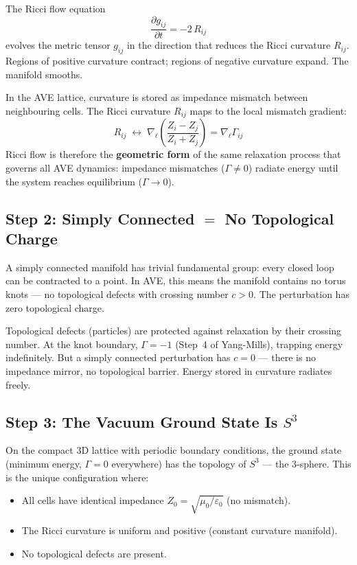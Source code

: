 The Ricci flow equation
\begin{equation}
    \frac{\partial g_{ij}}{\partial t} = -2\, R_{ij}
\end{equation}
evolves the metric tensor $g_{ij}$ in the direction that reduces the Ricci curvature $R_{ij}$. Regions of positive curvature contract; regions of negative curvature expand. The manifold smooths.

In the AVE lattice, curvature is stored as impedance mismatch between neighbouring cells. The Ricci curvature $R_{ij}$ maps to the local mismatch gradient:
\begin{equation}
    R_{ij} \;\longleftrightarrow\; \nabla_\ell \left(\frac{Z_i - Z_j}{Z_i + Z_j}\right) = \nabla_\ell \Gamma_{ij}
\end{equation}
Ricci flow is therefore the \textbf{geometric form} of the same relaxation process that governs all AVE dynamics: impedance mismatches ($\Gamma \neq 0$) radiate energy until the system reaches equilibrium ($\Gamma \to 0$).

\subsection{Step 2: Simply Connected $=$ No Topological Charge}

A simply connected manifold has trivial fundamental group: every closed loop can be contracted to a point. In AVE, this means the manifold contains no torus knots --- no topological defects with crossing number $c > 0$. The perturbation has zero topological charge.

Topological defects (particles) are protected against relaxation by their crossing number. At the knot boundary, $\Gamma = -1$\gammaundeclared{} (Step~4 of Yang-Mills), trapping energy indefinitely. But a simply connected perturbation has $c = 0$ --- there is no impedance mirror, no topological barrier. Energy stored in curvature radiates freely.

\subsection{Step 3: The Vacuum Ground State Is $S^3$}

On the compact 3D lattice with periodic boundary conditions, the ground state (minimum energy, $\Gamma = 0$ everywhere) has the topology of $S^3$ --- the 3-sphere. This is the unique configuration where:
\begin{itemize}
    \item All cells have identical impedance $Z_0 = \sqrt{\mu_0/\varepsilon_0}$ (no mismatch).
    \item The Ricci curvature is uniform and positive (constant curvature manifold).
    \item No topological defects are present.
\end{itemize}

